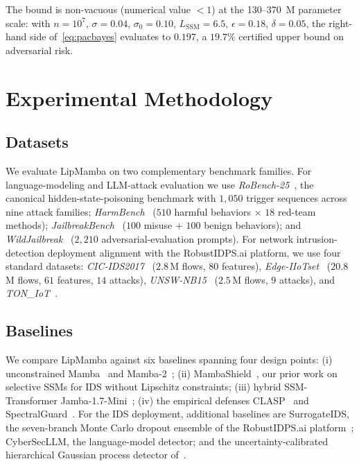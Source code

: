 \documentclass[12pt,a4paper]{article}
\theoremstyle{definition}
\theoremstyle{remark}
\newcommand{\modelname}{LipMamba}
\begin{document}
The bound is non-vacuous (numerical value $< 1$) at the 130--370~M parameter scale: with $n = 10^7$, $\sigma = 0.04$, $\sigma_0 = 0.10$, $L_{\mathrm{SSM}} = 6.5$, $\epsilon = 0.18$, $\delta = 0.05$, the right-hand side of~\eqref{eq:pacbayes} evaluates to $0.197$, a $19.7\%$ certified upper bound on adversarial risk.


\section{Experimental Methodology}
\label{sec:experiments}

\subsection{Datasets}

We evaluate \modelname{} on two complementary benchmark families. For language-modeling and LLM-attack evaluation we use \emph{RoBench-25}~\cite{lemercier2026hispa}, the canonical hidden-state-poisoning benchmark with $1{,}050$ trigger sequences across nine attack families; \emph{HarmBench}~\cite{mazeika2024harmbench} ($510$ harmful behaviors $\times$ $18$ red-team methods); \emph{JailbreakBench}~\cite{chao2024jailbreakbench} ($100$ misuse $+$ $100$ benign behaviors); and \emph{WildJailbreak}~\cite{jiang2024wildjailbreak} ($2{,}210$ adversarial-evaluation prompts). For network intrusion-detection deployment alignment with the RobustIDPS.ai platform, we use four standard datasets: \emph{CIC-IDS2017}~\cite{sharafaldin2018toward} ($2.8\,$M flows, $80$ features), \emph{Edge-IIoTset}~\cite{ferrag2022edge} ($20.8\,$M flows, $61$ features, $14$ attacks), \emph{UNSW-NB15}~\cite{moustafa2015unsw} ($2.5\,$M flows, $9$ attacks), and \emph{TON\_IoT}~\cite{alsaedi2020ton}.

\subsection{Baselines}

We compare \modelname{} against six baselines spanning four design points: (i) unconstrained Mamba~\cite{gu2024mamba} and Mamba-2~\cite{dao2024mamba2}; (ii) MambaShield~\cite{anaedevha2025mambashield}, our prior work on selective SSMs for IDS without Lipschitz constraints; (iii) hybrid SSM-Transformer Jamba-1.7-Mini~\cite{lieber2024jamba}; (iv) the empirical defenses CLASP~\cite{lemercier2026clasp} and SpectralGuard~\cite{lemercier2026spectralguard}. For the IDS deployment, additional baselines are SurrogateIDS, the seven-branch Monte Carlo dropout ensemble of the RobustIDPS.ai platform~\cite{anaedevha2026robustidps}; CyberSecLLM, the language-model detector; and the uncertainty-calibrated hierarchical Gaussian process detector of~\cite{anaedevha2026uchgp}.
\end{document}
